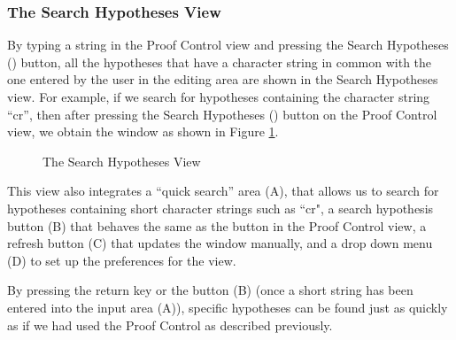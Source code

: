 


\subsubsection{The Search Hypotheses View}

By typing a string in the \textsf{Proof Control} view and pressing the \textsf{Search Hypotheses} () button, all the  hypotheses that have a character string in common with the one entered by the user in the editing area are shown in the Search Hypotheses view. For example, if we search for hypotheses containing the character string ``cr'', then after pressing the \textsf{Search Hypotheses} () button on the \textsf{Proof Control} view, we obtain the window as shown in Figure \ref{fig_ref_01_proving_perspective7}. 

\begin{figure}[!ht]
\begin{center}
	\caption{The Search Hypotheses View}
	\label{fig_ref_01_proving_perspective7}
\end{center}
\end{figure}

This view also integrates a ``quick search'' area (A), that allows us to search for hypotheses containing short character strings such as ``cr", a search hypothesis button (B) that behaves the same as the button in the Proof Control view, a refresh button (C) that updates the window manually, and a drop down menu (D) to set up the preferences for the view.

By pressing the return key or the button (B) (once a short string has been entered into the input area (A)), specific hypotheses can be found just as quickly as if we had used the Proof Control as described previously.

